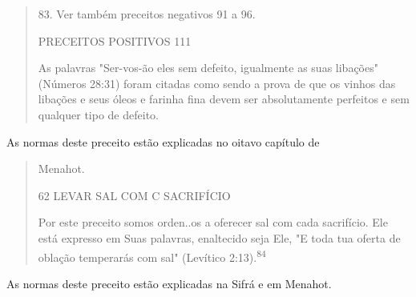 \begin{quote}
83. Ver também preceitos negativos 91 a 96.

PRECEITOS POSITIVOS 111

As palavras "Ser-vos-ão eles sem defeito, igualmente as suas libações"
(Números 28:31) foram citadas como sendo a prova de que os vinhos das
liba­ções e seus óleos e farinha fina devem ser absolutamente perfeitos
e sem qual­quer tipo de defeito.
\end{quote}

As normas deste preceito estão explicadas no oitavo capítulo de

\begin{quote}
Menahot.

62 LEVAR SAL COM C SACRIFÍCIO

Por este preceito somos orden..os a oferecer sal com cada sacrifí­cio.
Ele está expresso em Suas palavras, enaltecido seja Ele, "E toda tua
oferta de oblação temperarás com sal" (Levítico
2:13).\textsuperscript{84}
\end{quote}

As normas deste preceito estão explicadas na Sifrá e em Menahot.

